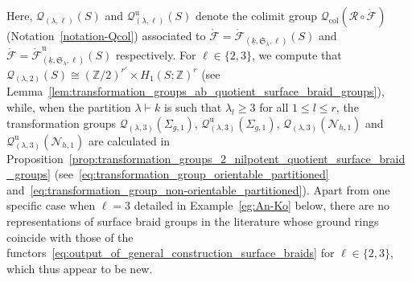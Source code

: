 \documentclass[AHL,Unicode,published]{cedram}
\newcommand{\Int}{\mathring}
\newcommand{\col}{\mathrm{col}}
\newcommand{\unt}{\mathrm{u}}
\newcommand{\Sym}{\mathfrak{S}}
\newcommand{\sR}{\mathscr{R}}
\newcommand{\N}{\mathscr{N}}
\newcommand{\cF}{\mathcal{F}}
\newcommand{\cQ}{\mathcal{Q}}
\newcommand{\bZ}{\mathbb{Z}}
\renewcommand{\geq}{\geqslant}
\renewcommand{\leq}{\leqslant}
\begin{document}
Here, $\cQ_{(\lambda,\ell)}(S)$ and $\cQ^{\unt}_{(\lambda,\ell)}(S)$ denote the colimit group $\cQ_{\col}(\sR \circ \Int{\cF})$ (Notation~\ref{notation-Qcol}) associated to $\Int{\cF} = \Int{\cF}_{(\underline{k},\Sym_{\lambda},\ell)}(S)$ and $\Int{\cF} = \Int{\cF}^{\unt}_{(\underline{k},\Sym_{\lambda},\ell)}(S)$ respectively. For $\ell\in \{2,3\}$, we compute that $\cQ_{(\lambda,2)}(S) \cong (\bZ/2)^{r'} \times H_{1}(S;\bZ)^{r}$ (see Lemma~\ref{lem:transformation_groups_ab_quotient_surface_braid_groups}), while, when the partition $\lambda \vdash k$ is such that $\lambda_{l}\geq 3$ for all $1\leq l\leq r$, the transformation groups $\cQ_{(\lambda,3)}(\Sigma_{g,1})$, $\cQ_{(\lambda,3)}^{\unt}(\Sigma_{g,1})$, $\cQ_{(\lambda,3)}(\N_{h,1})$ and $\cQ_{(\lambda,3)}^{\unt}(\N_{h,1})$ are calculated in Proposition~\ref{prop:transformation_groups_2_nilpotent_quotient_surface_braid_groups} (see~\eqref{eq:transformation_group_orientable_partitioned} and~\eqref{eq:transformation_group_non-orientable_partitioned}). Apart from one specific case when $\ell = 3$ detailed in Example~\ref{eg:An-Ko} below, there are no representations of surface braid groups in the literature whose ground rings coincide with those of the functors~\eqref{eq:output_of_general_construction_surface_braids} for $\ell\in \{2,3\}$, which thus appear to be new.
\end{document}
